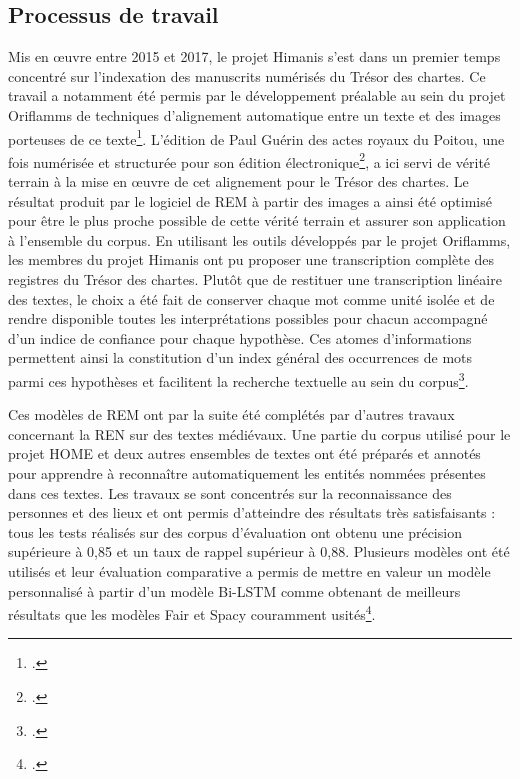 \documentclass[a4paper,12pt,twoside]{book}
\begin{document}
	\subsection{Processus de travail}
	
	Mis en œuvre entre 2015 et 2017, le projet Himanis s'est dans un premier temps concentré sur l'indexation des manuscrits numérisés du Trésor des chartes. Ce travail a notamment été permis par le développement préalable au sein du projet Oriflamms de techniques d'alignement automatique entre un texte et des images porteuses de ce texte\footcite{bluche_automatic_2016}. L'édition de Paul Guérin des actes royaux du Poitou, une fois numérisée et structurée pour son édition électronique\footcite{guerin_actes_1881}, a ici servi de vérité terrain à la mise en œuvre de cet alignement pour le Trésor des chartes. Le résultat produit par le logiciel de REM à partir des images a ainsi été optimisé pour être le plus proche possible de cette vérité terrain et assurer son application à l'ensemble du corpus. En utilisant les outils développés par le projet Oriflamms, les membres du projet Himanis ont pu proposer une transcription complète des registres du Trésor des chartes. Plutôt que de restituer une transcription linéaire des textes, le choix a été fait de conserver chaque mot comme unité isolée et de rendre disponible toutes les interprétations possibles pour chacun accompagné d'un indice de confiance pour chaque hypothèse. Ces atomes d'informations permettent ainsi la constitution d'un index général des occurrences de mots parmi ces hypothèses et facilitent la recherche textuelle au sein du corpus\footcite{stutzmann_recherche_2017}.
	
	Ces modèles de REM ont par la suite été complétés par d'autres travaux concernant la REN sur des textes médiévaux. Une partie du corpus utilisé pour le projet HOME et deux autres ensembles de textes ont été préparés et annotés pour apprendre à reconnaître automatiquement les entités nommées présentes dans ces textes. Les travaux se sont concentrés sur la reconnaissance des personnes et des lieux et ont permis d'atteindre des résultats très satisfaisants : tous les tests réalisés sur des corpus d'évaluation ont obtenu une précision supérieure à 0,85 et un taux de rappel supérieur à 0,88. Plusieurs modèles ont été utilisés et leur évaluation comparative a permis de mettre en valeur un modèle personnalisé à partir d'un modèle Bi-LSTM comme obtenant de meilleurs résultats que les modèles Fair et Spacy couramment usités\footcite{torres_aguilar_named_2021}.
	
\end{document}
